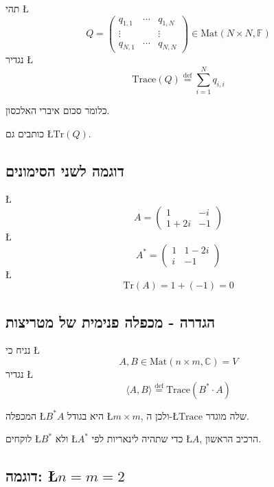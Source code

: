\documentclass[english,hebrew]{article}
\begin{document}
תהי \L{%
\[
Q=\begin{pmatrix}q_{1,1} & \cdots & q_{1,N}\\
\vdots &  & \vdots\\
q_{N,1} & \cdots & q_{N,N}
\end{pmatrix}\in\text{Mat}(N\times N,\mathbb{F})
\]
}%
נגדיר \L{%
\[
\text{Trace}(Q)\overset{\text{def}}{=}\sum_{i=1}^{N}q_{i,i}
\]
}%

כלומר סכום איברי האלכסון.

כותבים גם \L{$\text{Tr}(Q)$}.

\subsection{דוגמה לשני הסימונים}

\L{%
\[
A=\begin{pmatrix}1 & -i\\
1+2i & -1
\end{pmatrix}
\]
}%
\L{%
\[
A^{*}=\begin{pmatrix}1 & 1-2i\\
i & -1
\end{pmatrix}
\]
}%
\L{%
\[
\text{Tr}(A)=1+(-1)=0
\]
}%

\subsection{הגדרה - מכפלה פנימית של מטריצות}

נניח כי \L{%
\[
A,B\in\text{Mat}(n\times m,\mathbb{C})=V
\]
}%
נגדיר \L{%
\[
\langle A,B\rangle\overset{\text{def}}{=}\text{Trace}(B^{*}\cdot A)
\]
}%

המכפלה \L{$B^{*}A$} היא בגודל \L{$m\times m$}, ולכן ה-\L{$\text{Trace}$}
שלה מוגדר.

לוקחים \L{$B^{*}$} ולא \L{$A^{*}$} כדי שתהיה לינאריות לפי \L{$A$},
הרכיב הראשון. 

\subsection{דוגמה: \L{$n=m=2$}}
\end{document}
